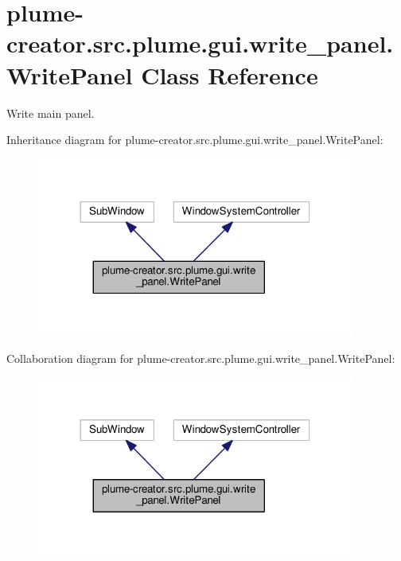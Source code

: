 \hypertarget{classplume-creator_1_1src_1_1plume_1_1gui_1_1write__panel_1_1_write_panel}{}\section{plume-\/creator.src.\+plume.\+gui.\+write\+\_\+panel.\+Write\+Panel Class Reference}
\label{classplume-creator_1_1src_1_1plume_1_1gui_1_1write__panel_1_1_write_panel}


\textquotesingle{}Write\textquotesingle{} main panel.  




Inheritance diagram for plume-\/creator.src.\+plume.\+gui.\+write\+\_\+panel.\+Write\+Panel\+:\nopagebreak
\begin{figure}[H]
\begin{center}
\leavevmode
\includegraphics[width=296pt]{classplume-creator_1_1src_1_1plume_1_1gui_1_1write__panel_1_1_write_panel__inherit__graph}
\end{center}
\end{figure}


Collaboration diagram for plume-\/creator.src.\+plume.\+gui.\+write\+\_\+panel.\+Write\+Panel\+:\nopagebreak
\begin{figure}[H]
\begin{center}
\leavevmode
\includegraphics[width=296pt]{classplume-creator_1_1src_1_1plume_1_1gui_1_1write__panel_1_1_write_panel__coll__graph}
\end{center}
\end{figure}
